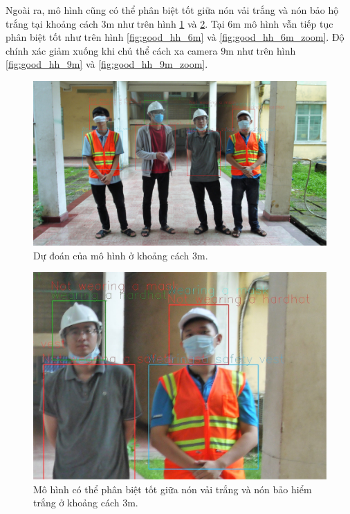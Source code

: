 Ngoài ra, mô hình cũng có thể phân biệt tốt giữa nón vải trắng và nón bảo hộ trắng tại khoảng cách $3$m như trên hình \ref{fig:good_hh} và \ref{fig:good_hh_zoom}. Tại $6$m mô hình vẫn tiếp tục phân biệt tốt như trên hình \ref{fig:good_hh_6m} và \ref{fig:good_hh_6m_zoom}. Độ chính xác giảm xuống khi chủ thể cách xa camera $9$m như trên hình \ref{fig:good_hh_9m} và \ref{fig:good_hh_9m_zoom}.
\begin{figure}[ht!]
	\centerline{\includegraphics[scale=0.1]{images/good_hh.jpg}}
  	\caption{Dự đoán của mô hình ở khoảng cách 3m.}
  	\label{fig:good_hh}
\end{figure}
\begin{figure}[ht!]
	\centerline{\includegraphics[scale=0.4]{images/good_hh_zoom.jpg}}
  	\caption{Mô hình có thể phân biệt tốt giữa nón vải trắng và nón bảo hiểm trắng ở khoảng cách 3m.}
  	\label{fig:good_hh_zoom}
\end{figure}
